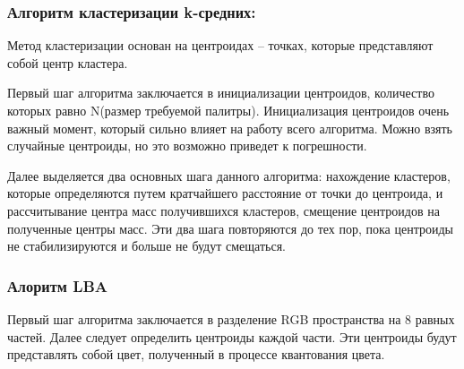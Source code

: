 \subsubsection{Алгоритм кластеризации k-средних:}
Метод кластеризации основан на центроидах -- точках, которые представляют собой центр кластера.

Первый шаг алгоритма заключается в инициализации центроидов, количество которых равно N(размер требуемой палитры). Инициализация центроидов очень важный момент, который сильно влияет на работу всего алгоритма. Можно взять случайные центроиды, но это возможно приведет к погрешности.

Далее выделяется два основных шага данного алгоритма: нахождение кластеров, которые определяются путем кратчайшего расстояние от точки до центроида, и рассчитывание центра масс получившихся кластеров, смещение центроидов на полученные центры масс. Эти два шага повторяются до тех пор, пока центроиды не стабилизируются и больше не будут смещаться.

\begin{figure}[ht!]
\end{figure}

\subsubsection{ Алоритм LBA}
Первый шаг алгоритма заключается в разделение RGB пространства на 8 равных частей. Далее следует определить центроиды каждой части. Эти центроиды будут представлять собой цвет, полученный в процессе квантования цвета.

\begin{figure}[ht!]
\end{figure}

